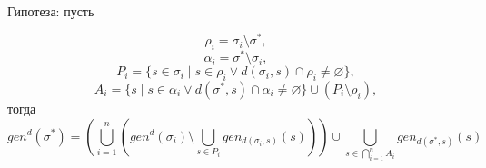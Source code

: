 



\\

Гипотеза: пусть

$$\rho_i = \sigma_i \setminus \sigma^*,$$
$$\alpha_i = \sigma^* \setminus \sigma_i,$$
$$P_i = \{s \in \sigma_i \mid s \in \rho_i \vee d(\sigma_i, s) \cap \rho_i \neq \varnothing \},$$
$$A_i = \{s \mid s \in \alpha_i \vee d(\sigma^*, s) \cap \alpha_i \neq \varnothing \} \cup (P_i \setminus \rho_i),$$
тогда
$$gen^d(\sigma^*) = \left( \bigcup\limits_{i = 1}^n \left( gen^d(\sigma_i) \setminus \bigcup\limits_{s \in P_i} gen_{d(\sigma_i, s)}(s)\right) \right) \cup \bigcup\limits_{s \in \bigcap\limits_{i = 1}^n A_i} gen_{d(\sigma^*, s)}(s)$$

